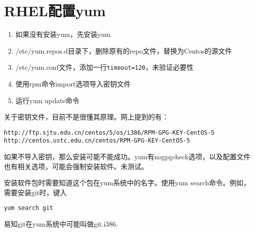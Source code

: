 
\section{RHEL配置yum}

\begin{enumerate}
    \item 如果没有安装yum，先安装yum
    \item /etc/yum.repos.d目录下，删除原有的repo文件，替换为Centos的源文件
    \item /etc/yum.conf文件，添加一行\verb+timeout=120+，未验证必要性
    \item 使用rpm命令import选项导入密钥文件
    \item 运行yum update命令
\end{enumerate}

关于密钥文件，目前不是很懂其原理。网上提到的有：
\begin{verbatim}
http://ftp.sjtu.edu.cn/centos/5/os/i386/RPM-GPG-KEY-CentOS-5
http://centos.ustc.edu.cn/centos/RPM-GPG-KEY-CentOS-5
\end{verbatim}
如果不导入密钥，那么安装可能不能成功。yum有nogpgcheck选项，以及配置文件也有相关选项，可能会强制安装软件。未测试。

安装软件包时需要知道这个包在yum系统中的名字。使用yum search命令。例如，需要安装git时，键入
\begin{verbatim}
yum search git
\end{verbatim}
易知git在yum系统中可能叫做git.i386.

